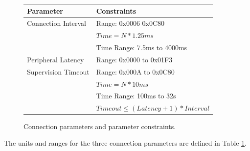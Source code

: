 \begin{figure}
    \begin{center}
    \begin{tabular}{|l|l|}
        \hline
        \textbf{Parameter} & \textbf{Constraints} \\
        \hline
        Connection Interval & Range: 0x0006 0x0C80 \\
                            & $Time = N * 1.25ms$ \\
                            & Time Range: 7.5ms to 4000ms \\
        \hline
        Peripheral Latency  & Range: 0x0000 to 0x01F3 \\
        \hline
        Supervision Timeout & Range: 0x000A to 0x0C80 \\
                            & $Time = N * 10ms$ \\
                            & Time Range: 100ms to 32s \\
                            & $Timeout \leq (Latency + 1) * Interval$ \\
        \hline
    \end{tabular}
    \end{center}
    \caption{Connection parameters and parameter constraints.}
    \label{tbl:conn_params}
\end{figure}

The units and ranges for the three connection parameters are defined in Table \ref{tbl:conn_params}.

